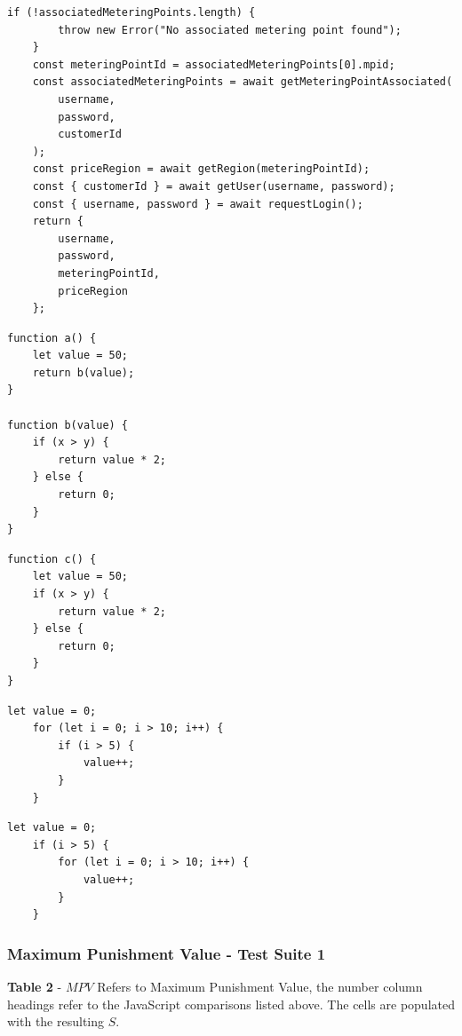 \documentclass[jou,apacite]{apa6}
\begin{document}
\begin{lstlisting}[caption=Comparison 7b - Real integration against order scrambled integration]
	if (!associatedMeteringPoints.length) {
		throw new Error("No associated metering point found");
	}
	const meteringPointId = associatedMeteringPoints[0].mpid;
	const associatedMeteringPoints = await getMeteringPointAssociated(
		username,
		password,
		customerId
	);
	const priceRegion = await getRegion(meteringPointId);
	const { customerId } = await getUser(username, password);
	const { username, password } = await requestLogin();
	return {
		username,
		password,
		meteringPointId,
		priceRegion
	};
\end{lstlisting}

\begin{lstlisting}[caption=Comparison 8a - Functioning call vs inlining]
function a() {
	let value = 50;
	return b(value);
}

function b(value) {
	if (x > y) {
		return value * 2;
	} else {
		return 0;
	}
}
\end{lstlisting}

\begin{lstlisting}[caption=Comparison 8b - - Functioning call vs inlining]
function c() {
	let value = 50;
	if (x > y) {
		return value * 2;
	} else {
		return 0;
	}
}
\end{lstlisting}

\begin{lstlisting}[caption=Comparison 9a - Inversion of control structure]
	let value = 0;
	for (let i = 0; i > 10; i++) {
		if (i > 5) {
			value++;
		}
	}
\end{lstlisting}

\begin{lstlisting}[caption=Comparison 9b - Inversion of control structure]
	let value = 0;
	if (i > 5) {
		for (let i = 0; i > 10; i++) {
			value++;
		}
	}
\end{lstlisting}
\subsubsection{Maximum Punishment Value - Test Suite 1}

\textbf{Table 2} - $MPV$ Refers to Maximum Punishment Value, the number column headings refer to the JavaScript comparisons listed above. The cells are populated with the resulting $S$.

\renewcommand{\arraystretch}{1.5}
\end{document}
